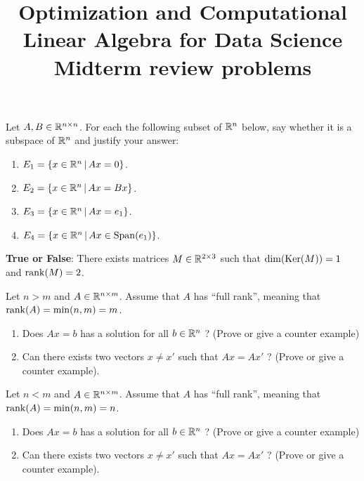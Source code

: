 \documentclass[11pt,nocut]{article}
\title{\vspace{-2.0cm}%
	Optimization and Computational Linear Algebra for Data Science\\
Midterm review problems}
\date{}
\begin{document}
\maketitle


\begin{problem}
	Let $A,B \in \mathbb{R}^{n \times n}$. For each the following subset of $\mathbb{R}^n$ below, say whether it is a subspace of $\mathbb{R}^n$ and justify your answer:
	\begin{enumerate}
		\item $E_1 = \{ x \in \mathbb{R}^n \, | \, Ax = 0 \}$.
		\item $E_2 = \{ x \in \mathbb{R}^n \, | \, Ax = Bx \}$.
		\item $E_3 = \{ x \in \mathbb{R}^n \, | \, Ax = e_1 \}$.
		\item $E_4 = \{ x \in \mathbb{R}^n \, | \, Ax \in {{\rm Span}}(e_1) \}$.
	\end{enumerate}
\end{problem}
\vspace{0.2cm}

\begin{problem}
	\textbf{True or False}: There exists matrices $M \in \mathbb{R}^{2 \times 3}$ such that ${{\rm dim}}({{\rm Ker}}(M))=1$ and ${{\rm rank}}(M)=2$.
\end{problem}
\vspace{0.2cm}

\begin{problem}
	Let $n>m$ and $A \in \mathbb{R}^{n \times m}$. Assume that $A$ has ``full rank'', meaning that ${{\rm rank}}(A)=\min(n,m)=m$.
	\begin{enumerate}
		\item Does $Ax=b$ has a solution for all $b \in \mathbb{R}^n$ ? (Prove or give a counter example)
		\item Can there exists two vectors $x \neq x'$ such that $Ax=Ax'$ ? (Prove or give a counter example).
	\end{enumerate}
\end{problem}
\vspace{0.2cm}
\begin{problem}
	Let $n<m$ and $A \in \mathbb{R}^{n \times m}$. Assume that $A$ has ``full rank'', meaning that ${{\rm rank}}(A)=\min(n,m)=n$.
	\begin{enumerate}
		\item Does $Ax=b$ has a solution for all $b \in \mathbb{R}^n$ ? (Prove or give a counter example)
		\item Can there exists two vectors $x \neq x'$ such that $Ax=Ax'$ ? (Prove or give a counter example).
	\end{enumerate}
\end{problem}
\end{document}
